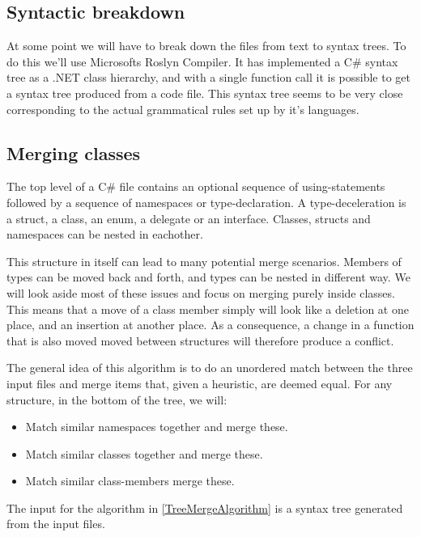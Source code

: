 \documentclass[11pt]{article}
\begin{document}
\subsection{Syntactic breakdown}
At some point we will have to break down the files from text to syntax trees. To do this we'll use Microsofts Roslyn Compiler. It has implemented a C\# syntax tree as a .NET class hierarchy, and with a single function call it is possible to get a syntax tree produced from a code file. This syntax tree seems to be very close corresponding to the actual grammatical rules set up by it's languages.




\subsection{Merging classes}
\label{mergingclasses}
The top level of a C\# file contains an optional sequence of using-statements followed by a sequence of namespaces or type-declaration. A type-deceleration is a struct, a class, an enum, a delegate or an interface. Classes, structs and namespaces can be nested in eachother.

This structure in itself can lead to many potential merge scenarios. Members of types can be moved back and forth, and types can be nested in different way. We will look aside most of these issues and focus on merging purely inside classes. This means that a move of a class member simply will look like a deletion at one place, and an insertion at another place. As a consequence, a change in a function that is also moved moved between structures will therefore produce a conflict.

The general idea of this algorithm is to do an unordered match between the three input files and merge items that, given a heuristic, are deemed equal. For any structure, in the bottom of the tree, we will:

\begin{itemize}
   \item Match similar namespaces together and merge these.
   \item Match similar classes together and merge these.
   \item Match similar class-members merge these.
\end{itemize}

The input for the algorithm in \ref{TreeMergeAlgorithm} is a syntax tree generated from the input files. 
\end{document}
